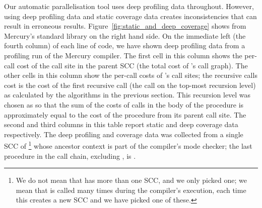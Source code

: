 Our automatic parallelisation tool uses deep profiling data throughout.
However, using deep profiling data and static coverage data creates
inconsistencies that can result in erroneous results.
Figure~\ref{fig:static_and_deep_coverage} shows \listfoldlthree from
Mercury's standard library on the right hand side.
On the immediate left (the fourth column) of each line of code,
we have shown deep profiling data from a profiling run of the Mercury
compiler.
The first cell in this column shows the per-call cost of the
call site in the parent SCC (the total cost of \foldlthree's call graph).
The other cells in this column show the per-call costs of \foldlthree's call
sites;
the recursive calls cost is the cost of the first recursive call
(the call on the top-most recursion level)
as calculated by the algorithms in the previous section.
This recursion level was chosen as so that the sum of the costs of calls in
the body of the procedure is approximately equal to the cost of the procedure
from its parent call site.
The second and third columns in this table report static and deep coverage
data respectively.
The deep profiling and coverage data was collected from a single SCC of
\foldlthree\footnote{
    We do not mean that \foldlthree has more than one SCC, and we only
    picked one;
    we mean that \foldlthree is called many times during the compiler's
    execution, each time this creates a new SCC and we have picked one of
    these.}
whose ancestor context  is part of the compiler's mode checker;
the last procedure in the call chain, excluding \foldlthree, is
.

